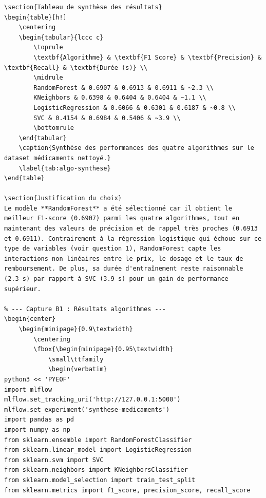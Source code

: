\documentclass[12pt,a4paper]{report}
\begin{document}
\begin{center}
\begin{minipage}{0.9\textwidth}
{\begin{minipage}{0.95\textwidth}
\begin{verbatim}
\section{Tableau de synthèse des résultats}
\begin{table}[h!]
    \centering
    \begin{tabular}{lccc c}
        \toprule
        \textbf{Algorithme} & \textbf{F1 Score} & \textbf{Precision} & \textbf{Recall} & \textbf{Durée (s)} \\
        \midrule
        RandomForest & 0.6907 & 0.6913 & 0.6911 & ~2.3 \\
        KNeighbors & 0.6398 & 0.6404 & 0.6404 & ~1.1 \\
        LogisticRegression & 0.6066 & 0.6301 & 0.6187 & ~0.8 \\
        SVC & 0.4154 & 0.6984 & 0.5406 & ~3.9 \\
        \bottomrule
    \end{tabular}
    \caption{Synthèse des performances des quatre algorithmes sur le dataset médicaments nettoyé.}
    \label{tab:algo-synthese}
\end{table}

\section{Justification du choix}
Le modèle **RandomForest** a été sélectionné car il obtient le meilleur F1‑score (0.6907) parmi les quatre algorithmes, tout en maintenant des valeurs de précision et de rappel très proches (0.6913 et 0.6911). Contrairement à la régression logistique qui échoue sur ce type de variables (voir question 1), RandomForest capte les interactions non linéaires entre le prix, le dosage et le taux de remboursement. De plus, sa durée d'entraînement reste raisonnable (2.3 s) par rapport à SVC (3.9 s) pour un gain de performance supérieur.

% --- Capture B1 : Résultats algorithmes ---
\begin{center}
    \begin{minipage}{0.9\textwidth}
        \centering
        \fbox{\begin{minipage}{0.95\textwidth}
            \small\ttfamily
            \begin{verbatim}
python3 << 'PYEOF'
import mlflow
mlflow.set_tracking_uri('http://127.0.0.1:5000')
mlflow.set_experiment('synthese-medicaments')
import pandas as pd
import numpy as np
from sklearn.ensemble import RandomForestClassifier
from sklearn.linear_model import LogisticRegression
from sklearn.svm import SVC
from sklearn.neighbors import KNeighborsClassifier
from sklearn.model_selection import train_test_split
from sklearn.metrics import f1_score, precision_score, recall_score


\end{verbatim}
\end{minipage}}
\end{minipage}
\end{center}
\end{document}
